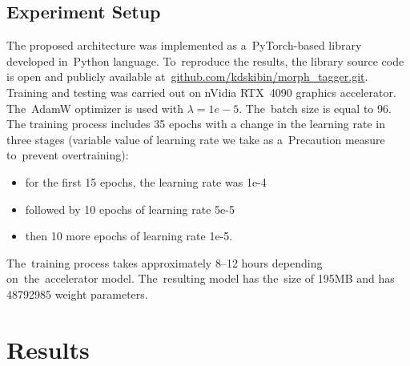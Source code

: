 \documentclass[11pt,twocolumn]{article}
\begin{document}
\subsection{Experiment Setup}

The proposed architecture was implemented as a~PyTorch-based library developed in~Python language. 
To~reproduce the results,
the library source code is open and publicly available at~\href{https://github.com/kdskibin/morph\_tagger.git}{github.com{\slash}kdskibin{\slash}morph\_tagger.git}.
Training and testing was carried out on nVidia RTX~4090 graphics accelerator.
The~AdamW optimizer is used with $\lambda = 1e-5$.
The~batch size is equal to 96.
The training process includes 35 epochs with a change in the learning rate in three stages (variable value of learning rate we take as a~Precaution measure to~prevent overtraining):

\begin{itemize}
\item{for the first 15 epochs, the learning rate was 1e-4}
\item{followed by 10 epochs of learning rate 5e-5}
\item{then 10 more epochs of learning rate 1e-5}.
\end{itemize}

The~training process takes approximately 8--12 hours depending on~the~accelerator model.
The~resulting model has the~size of 195MB and has 48792985 weight parameters.

\section{Results}
\end{document}
